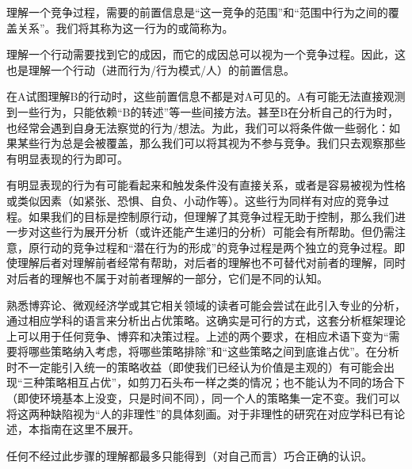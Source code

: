 理解一个竞争过程，需要的前置信息是“这一竞争的范围”和“范围中行为之间的覆盖关系”。我们将其称为这一行为的或简称为。
\begin{explain}
理解一个行动需要找到它的成因，而它的成因总可以视为一个竞争过程。因此，这也是理解一个行动（进而行为/行为模式/人）的前置信息。

在A试图理解B的行动时，这些前置信息不都是对A可见的。A有可能无法直接观测到一些行为，只能依赖“B的转述”等一些间接方法。甚至B在分析自己的行为时，也经常会遇到自身无法察觉的行为/想法。为此，我们可以将条件做一些弱化：如果某些行为总是会被覆盖，那么我们可以将其视为不参与竞争。我们只去观察那些有明显表现的行为即可。

有明显表现的行为有可能看起来和触发条件没有直接关系，或者是容易被视为性格或类似因素（如紧张、恐惧、自负、小动作等）。这些行为同样有对应的竞争过程。如果我们的目标是控制原行动，但理解了其竞争过程无助于控制，那么我们进一步对这些行为展开分析（或许还能产生递归的分析）可能会有所帮助。但仍需注意，原行动的竞争过程和“潜在行为的形成”的竞争过程是两个独立的竞争过程。即使理解后者对理解前者经常有帮助，对后者的理解也不可替代对前者的理解，同时对后者的理解也不属于对前者理解的一部分，它们是不同的认知。

熟悉博弈论、微观经济学或其它相关领域的读者可能会尝试在此引入专业的分析，通过相应学科的语言来分析出占优策略。这确实是可行的方式，这套分析框架理论上可以用于任何竞争、博弈和决策过程。上述的两个要求，在相应术语下变为“需要将哪些策略纳入考虑，将哪些策略排除”和“这些策略之间到底谁占优”。在分析时不一定能引入统一的策略收益（即使我们已经认为价值是主观的）有可能会出现“三种策略相互占优”，如剪刀石头布一样之类的情况；也不能认为不同的场合下（即使环境基本上没变，只是时间不同），同一个人的策略集一定不变。我们可以将这两种缺陷视为“人的非理性”的具体刻画。对于非理性的研究在对应学科已有论述，本指南在这里不展开。
\end{explain}
任何不经过此步骤的理解都最多只能得到（对自己而言）巧合正确的认识。

